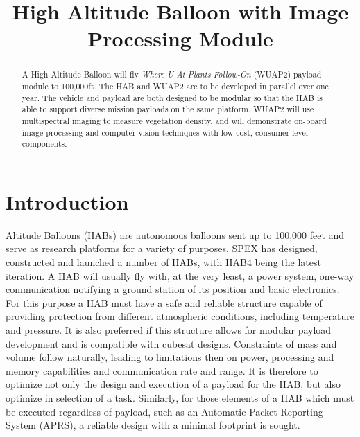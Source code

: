 \documentclass[conference]{IEEEtran} %
\title{High Altitude Balloon with Image Processing Module}
\author{
  \IEEEauthorblockN{%
    Keshav~Adhyay\IEEEauthorrefmark{1}
    Philip~Linden\IEEEauthorrefmark{2}
  }
  \IEEEauthorblockA{%
    RIT Space Exploration, Rochester Institute of Technology \\ %
    Rochester, N.Y. \\
    Email:
    \IEEEauthorrefmark{1}keshavsemail@rit.edu
    \IEEEauthorrefmark{2}pjl7651@rit.edu
  }

}
\begin{document}
\maketitle%

\begin{abstract}
  A High Altitude Balloon will fly \textit{Where U At Plants Follow-On} (WUAP2) payload module to 100,000ft. 
  The HAB and WUAP2 are to be developed in parallel over one year. 
  The vehicle and payload are both designed to be modular so that the HAB is able to support diverse mission payloads on the same platform. 
  WUAP2 will use multispectral imaging to measure vegetation density, and will demonstrate on-board image processing and computer vision techniques with low cost, consumer level components.

\end{abstract}

\section{Introduction}
 Altitude Balloons (HABs) are autonomous balloons sent up to 100,000 feet and serve as research platforms for a variety of purposes. 
SPEX has designed, constructed and launched a number of HABs, with HAB4 being the latest iteration. 
A HAB will usually fly with, at the very least, a power system, one-way communication notifying a ground station of its position and basic electronics. 
For this purpose a HAB must have a safe and reliable structure capable of providing protection from different atmospheric conditions, including temperature and pressure. 
It is also preferred if this structure allows for modular payload development and is compatible with cubesat designs. 
Constraints of mass and volume follow naturally, leading to limitations then on power, processing and memory capabilities and communication rate and range. 
It is therefore to optimize not only the design and execution of a payload for the HAB, but also optimize in selection of a task. 
Similarly, for those elements of a HAB which must be executed regardless of payload, such as an Automatic Packet Reporting System (APRS), a reliable design with a minimal footprint is sought.
\end{document}
